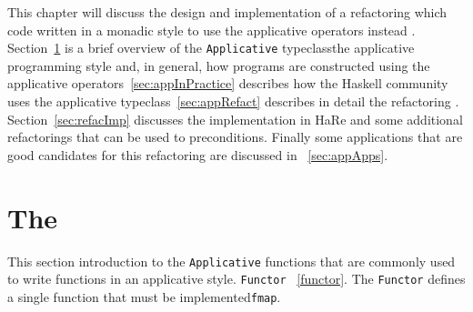 This chapter will discuss the design and implementation of a refactoring which \DIFdelbegin {}\DIFdelend \DIFaddbegin {}\DIFaddend code written in a monadic style to use the applicative operators instead \DIFaddbegin {}\DIFaddend . Section~\ref{sec:appOverview} is a brief overview of the \DIFaddbegin {}\DIFaddend \texttt{Applicative} typeclass\DIFdelbegin {}\DIFdelend \DIFaddbegin {}\DIFaddend the applicative programming style and, in general, how programs are constructed using the applicative operators\DIFdelbegin {}\DIFdelend \DIFaddbegin {}\DIFaddend ~\ref{sec:appInPractice} describes how the Haskell community uses the applicative typeclass\DIFdelbegin {}\DIFdelend \DIFaddbegin {}\DIFaddend ~\ref{sec:appRefact} describes in detail the refactoring \DIFaddbegin {}\DIFaddend . Section~\ref{sec:refacImp} discusses the \DIFdelbegin {}\DIFdelend \DIFaddbegin {}\DIFaddend implementation in HaRe and some additional refactorings that can be used to \DIFdelbegin {}\DIFdelend \DIFaddbegin {}\DIFaddend preconditions. Finally some applications that are good candidates for this refactoring are discussed in \DIFdelbegin {}\DIFdelend \DIFaddbegin {}\DIFaddend ~\ref{sec:appApps}.

\section{The \DIFdelbegin {}\DIFdelend \DIFaddbegin {}\DIFaddend }
\label{sec:appOverview}
This section \DIFdelbegin {}\DIFdelend \DIFaddbegin {}\DIFaddend introduction to the \texttt{Applicative} \DIFdelbegin {}\DIFdelend \DIFaddbegin {}\DIFaddend functions that are commonly used to write functions in an applicative style. 
\DIFdelbegin {}\texttt{}%
\DIFdel{, }\DIFdelend \DIFaddbegin {}\DIFaddend \texttt{Functor} \DIFdelbegin {}\DIFdelend \DIFaddbegin {}\DIFaddend ~\ref{functor}. The \texttt{Functor} \DIFdelbegin {}\DIFdelend \DIFaddbegin {}\DIFaddend defines a single function that must be implemented\DIFdelbegin \DIFdel{, }\DIFdelend \DIFaddbegin \DIFadd{: }\DIFaddend \texttt{fmap}.

